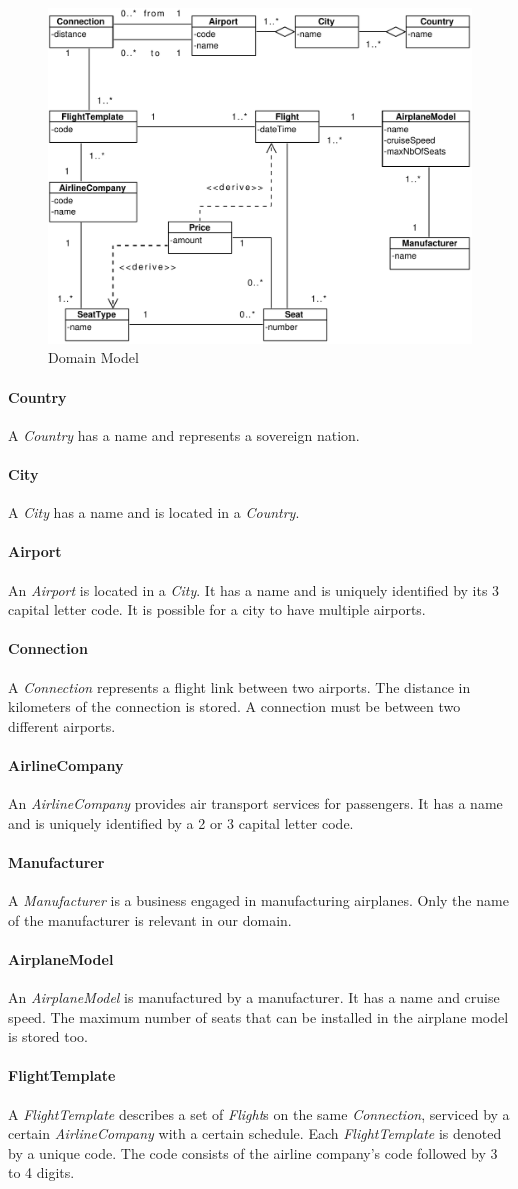 \documentclass[a4paper]{article}
\newcommand{\field}[1]{\emph{#1}}
\begin{document}
\begin{figure}[ht!]
  \includegraphics[width=1.0\textwidth]{../analysis/domainModel.pdf}
  \caption{Domain Model}\label{fig:domain-model}
\end{figure}

\newcommand{\entity}[1]{\vspace{-1.5em}\paragraph{#1}}

\entity{Country}
A \field{Country} has a name and represents a sovereign nation.
\entity{City}
A \field{City} has a name and is located in a \field{Country}.
\entity{Airport}
An \field{Airport} is located in a \field{City}.
It has a name and is uniquely identified by its 3 capital letter code.
It is possible for a city to have multiple airports.
\entity{Connection}
A \field{Connection} represents a flight link between two airports.
The distance in kilometers of the connection is stored.
A connection must be between two different airports.
\entity{AirlineCompany}
An \field{AirlineCompany} provides air transport services for passengers.
It has a name and is uniquely identified by a 2 or 3 capital letter code.
\entity{Manufacturer}
A \field{Manufacturer} is a business engaged in manufacturing airplanes.
Only the name of the manufacturer is relevant in our domain.
\entity{AirplaneModel}
An \field{AirplaneModel} is manufactured by a manufacturer.
It has a name and cruise speed.
The maximum number of seats that can be installed in the airplane model is stored too.
\entity{FlightTemplate}
A \field{FlightTemplate} describes a set of \field{Flight}s on the same \field{Connection}, serviced by a certain \field{AirlineCompany} with a certain schedule.
Each \field{FlightTemplate} is denoted by a unique code.
The code consists of the airline company's code followed by 3 to 4 digits.
\end{document}
